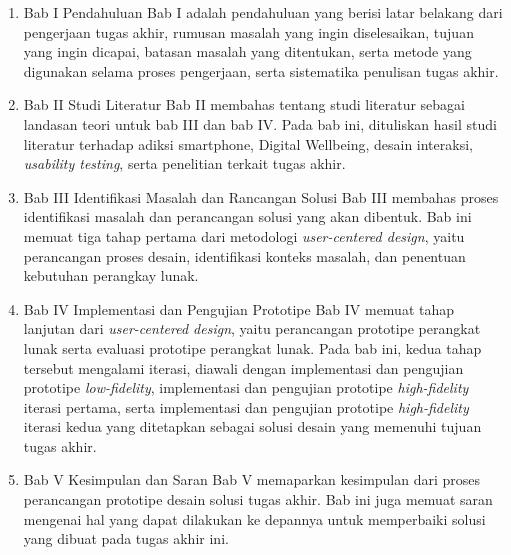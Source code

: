 \begin{enumerate}
  \item Bab I Pendahuluan
  \subitem Bab I adalah pendahuluan yang berisi latar belakang dari pengerjaan tugas akhir, rumusan masalah yang ingin diselesaikan, tujuan yang ingin dicapai, batasan masalah yang ditentukan, serta metode yang digunakan selama proses pengerjaan, serta sistematika penulisan tugas akhir.
   
  \item Bab II Studi Literatur
  \subitem Bab II membahas tentang studi literatur sebagai landasan teori untuk bab III dan bab IV. Pada bab ini, dituliskan hasil studi literatur terhadap adiksi smartphone, Digital Wellbeing, desain interaksi, \textit{usability testing}, serta penelitian terkait tugas akhir.
 
  \item Bab III Identifikasi Masalah dan Rancangan Solusi
  \subitem Bab III membahas proses identifikasi masalah dan perancangan solusi yang akan dibentuk. Bab ini memuat tiga tahap pertama dari metodologi \textit{user-centered design}, yaitu perancangan proses desain, identifikasi konteks masalah, dan penentuan kebutuhan perangkay lunak.
 
  \item Bab IV Implementasi dan Pengujian Prototipe
  \subitem Bab IV memuat tahap lanjutan dari \textit{user-centered design}, yaitu perancangan prototipe perangkat lunak serta evaluasi prototipe perangkat lunak. Pada bab ini, kedua tahap tersebut mengalami iterasi, diawali dengan implementasi dan pengujian prototipe \textit{low-fidelity}, implementasi dan pengujian prototipe \textit{high-fidelity} iterasi pertama, serta implementasi dan pengujian prototipe \textit{high-fidelity} iterasi kedua yang ditetapkan sebagai solusi desain yang memenuhi tujuan tugas akhir.
 
  \item Bab V Kesimpulan dan Saran
  \subitem Bab V memaparkan kesimpulan dari proses perancangan prototipe desain solusi tugas akhir. Bab ini juga memuat saran mengenai hal yang dapat dilakukan ke depannya untuk memperbaiki solusi yang dibuat pada tugas akhir ini.
\end{enumerate}